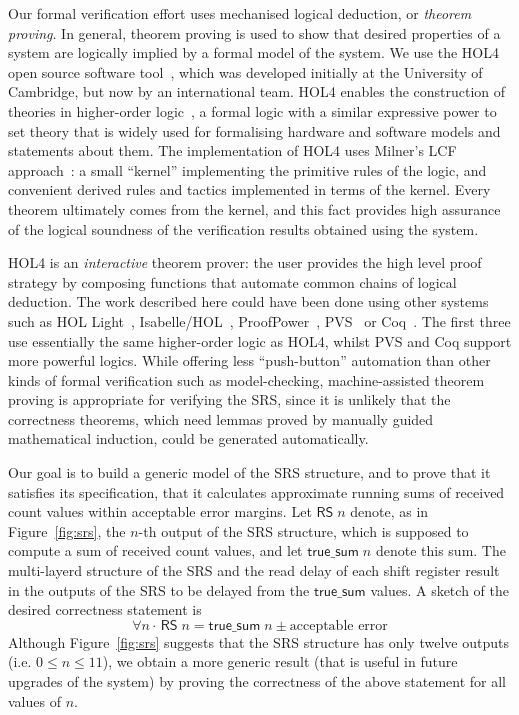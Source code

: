 \documentclass{llncs}
\begin{document}
Our formal verification effort uses mechanised logical deduction, or \emph{theorem proving}.
In general, theorem proving is used to show that desired properties of a system are logically implied by a formal model of the system.
We use the HOL4 open source software tool~\cite{HOL4,DBLP:conf/tphol/SlindN08}, which was developed initially at the University of Cambridge, but now by an international team.
HOL4 enables the construction of theories in higher-order logic~\cite{DBLP:journals/jsyml/Church40}, a formal logic with a similar expressive power to set theory that is widely used for formalising hardware and software models and statements about them.
The implementation of HOL4 uses Milner's LCF approach~\cite{Milner:1972:LCF:891954}: a small ``kernel'' implementing the primitive rules of the logic, and convenient derived rules and tactics implemented in terms of the kernel.
Every theorem ultimately comes from the kernel, and this fact provides high assurance of the logical soundness of the verification results obtained using the system.

HOL4 is an \emph{interactive} theorem prover: the user provides the high level proof strategy by composing functions that automate common chains of logical deduction.
The work described here could have been done using other systems such as HOL Light~\cite{HOLLight,DBLP:conf/tphol/Harrison09a}, Isabelle/HOL~\cite{Isabelle}, ProofPower~\cite{ProofPower}, PVS~\cite{PVS,DBLP:conf/tphol/OwreS08} or Coq~\cite{Coq}.
The first three use essentially the same higher-order logic as HOL4, whilst PVS and Coq support more powerful logics.
While offering less ``push-button'' automation than other kinds of formal verification such as model-checking, machine-assisted theorem proving is appropriate for verifying the SRS, since it is unlikely that the correctness theorems, which need lemmas proved by manually guided mathematical induction, could be generated automatically.

Our goal is to build a generic model of the SRS structure, and to prove that it satisfies its specification, that it calculates approximate running sums of received count values within acceptable error margins.
Let $\mathsf{RS}\;n$ denote, as in Figure~\ref{fig:srs}, the $n$-th output of the SRS structure, which is supposed to compute a sum of received count values, and let $\mathsf{true\_sum}\;n$ denote this sum.
The multi-layerd structure of the SRS and the read delay of each shift register result in the outputs of the SRS to be delayed from the $\mathsf{true\_sum}$ values.
A sketch of the desired correctness statement is \[\forall{n} \cdot \, \mathsf{RS}\;n= \mathsf{true\_sum}\; n \pm\text{acceptable error}\]
Although Figure~\ref{fig:srs} suggests that the SRS structure has only twelve outputs  (i.e. $0\leq{n}\leq11$), we obtain a more generic result (that is useful in future upgrades of the system) by proving the correctness of the above statement for all values of $n$.
\end{document}
